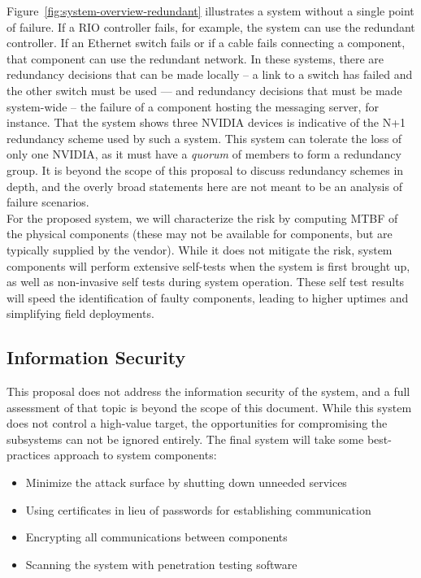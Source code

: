\documentclass[12pt]{article}
\begin{document}
{Figure~\ref{fig:system-overview-redundant} illustrates a system without a single point of failure. If a RIO controller fails, for example, the system can use the redundant controller. If an Ethernet switch fails or if a cable fails connecting a component, that component can use the redundant network. In these systems, there are redundancy decisions that can be made locally -- a link to a switch has failed and the other switch must be used --- and redundancy decisions that must be made system-wide -- the failure of a component hosting the messaging server, for instance. That the system shows three NVIDIA devices is indicative of the N+1 redundancy scheme used by such a system. This system can tolerate the loss of only one NVIDIA, as it must have a \textit{quorum} of members to form a redundancy group. It is beyond the scope of this proposal to discuss redundancy schemes in depth, and the overly broad statements here are not meant to be an analysis of failure scenarios. \\
For the proposed system, we will characterize the risk by computing MTBF of the physical components (these may not be available for components, but are typically supplied by the vendor).  While it does not mitigate the risk, system components will perform extensive self-tests when the system is first brought up, as well as non-invasive self tests during system operation. These self test results will speed the identification of faulty components, leading to higher uptimes and simplifying field deployments.
 
\subsection{Information Security}
This proposal does not address the information security of the system, and a full assessment of that topic is beyond the scope of this document. While this system does not control a high-value target, the opportunities for compromising the subsystems can not be ignored entirely. The final system will take some best-practices approach to system components:
\begin{itemize}
	\item{Minimize the attack surface by shutting down unneeded services}
	\item{Using certificates in lieu of passwords for establishing communication}
	\item{Encrypting all communications between components}
	\item{Scanning the system with penetration testing software}
\end{itemize}


}
\end{document}
